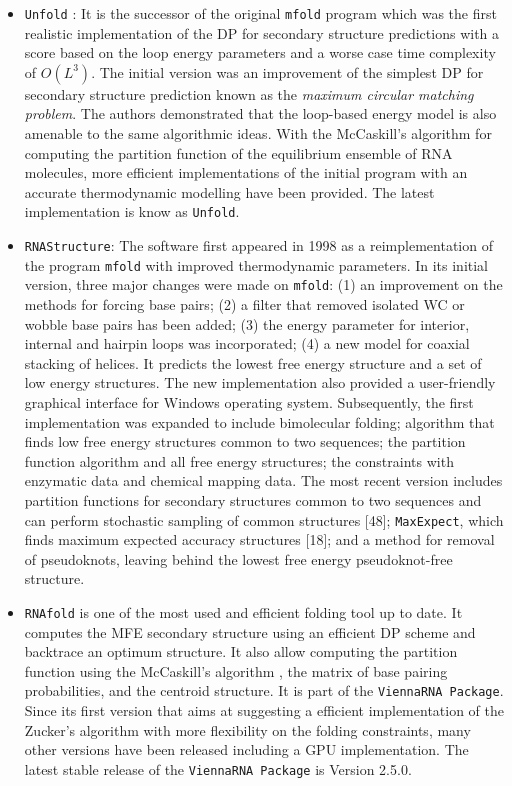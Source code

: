\begin{itemize}
	\item \texttt{Unfold} \cite{zuker1981optimal, zuker1984rna}: It is the successor of the original  \texttt{mfold} program which was the first realistic implementation of the DP for secondary structure predictions with a score based on the loop energy parameters and a worse case time complexity of $O(L^3)$. The initial version was an improvement of the simplest DP for secondary structure prediction known as the \textit{maximum circular matching problem}. The authors demonstrated that the loop-based energy model is also amenable to the same algorithmic ideas. With the McCaskill's algorithm for computing the partition function of the equilibrium ensemble of RNA molecules, more efficient implementations of the initial program with an accurate thermodynamic modelling have been provided. The latest implementation is know as \texttt{Unfold}.
	
	\item \texttt{RNAStructure}\cite{matthews1998updated,reuter2010rnastructure}: The software first appeared in 1998 as a reimplementation of the program \texttt{mfold} with improved thermodynamic parameters. In its initial version, three major changes were made on \texttt{mfold}: (1) an improvement on the methods for forcing base pairs; (2) a filter that removed isolated WC or wobble base pairs has been added; (3) the energy parameter for interior, internal and hairpin loops was incorporated; (4) a new model for coaxial stacking of helices.  It predicts the lowest free energy structure and a set of low energy structures. The new implementation also provided a user-friendly graphical interface for Windows operating system. Subsequently, the first implementation was expanded to include bimolecular folding; algorithm that finds low free energy structures common to two sequences; the partition function algorithm and all free energy structures; the constraints with enzymatic data and chemical mapping data. The most recent version includes partition functions for secondary structures common to two sequences and can perform stochastic sampling of common structures [48]; \texttt{MaxExpect}, which finds maximum expected accuracy structures [18]; and a method for removal of pseudoknots, leaving behind the lowest free energy pseudoknot-free structure. 
	
	\item \texttt{RNAfold} \cite{hofacker1994fast,lorenz11_vienn_packag} is one of the most used and efficient folding tool up to date. It computes the MFE secondary structure using an efficient DP scheme and backtrace an optimum structure. It also allow computing the partition function using the McCaskill’s algorithm \cite{mccaskill1990equilibrium}, the matrix of base pairing probabilities, and the centroid structure. It is part of the \texttt{ViennaRNA Package}. Since its first version that aims at suggesting a efficient implementation of the Zucker's algorithm with more flexibility on the folding constraints, many other versions have been released including a GPU implementation. The latest stable release of the \texttt{ViennaRNA Package} is Version 2.5.0.
	

\end{itemize}
